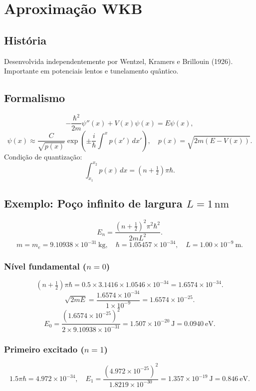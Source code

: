 \documentclass[12pt]{article}
\begin{document}
\section{Aproximação WKB}

\subsection{História}
Desenvolvida independentemente por Wentzel, Kramers e Brillouin (1926). Importante em potenciais lentos e tunelamento quântico.

\subsection{Formalismo}
\[
-\frac{\hbar^2}{2m}\psi''(x)+V(x)\psi(x)=E\psi(x),
\]
\[
\psi(x)\approx\frac{C}{\sqrt{p(x)}}\exp\left(\pm\frac{i}{\hbar}\int^x p(x')\,dx'\right),
\quad p(x)=\sqrt{2m(E-V(x))}.
\]
Condição de quantização:
\[
\int_{x_1}^{x_2}p(x)\,dx=\left(n+\tfrac12\right)\pi\hbar.
\]

\subsection{Exemplo: Poço infinito de largura $L=1\,\text{nm}$}
\[
E_n=\frac{(n+\tfrac12)^2\pi^2\hbar^2}{2mL^2}.
\]
\[
m=m_e=9.10938\times10^{-31}\ \text{kg},\quad
\hbar=1.05457\times10^{-34},\quad
L=1.00\times10^{-9}\ \text{m}.
\]

\subsubsection{Nível fundamental ($n=0$)}
\[
(n+\tfrac12)\pi\hbar=0.5\times3.1416\times1.0546\times10^{-34}=1.6574\times10^{-34}.
\]
\[
\sqrt{2mE}=\frac{1.6574\times10^{-34}}{1\times10^{-9}}=1.6574\times10^{-25}.
\]
\[
E_0=\frac{(1.6574\times10^{-25})^2}{2\times9.10938\times10^{-31}}=1.507\times10^{-20}\ \text{J}=0.0940\ \text{eV}.
\]

\subsubsection{Primeiro excitado ($n=1$)}
\[
1.5\pi\hbar=4.972\times10^{-34},\quad
E_1=\frac{(4.972\times10^{-25})^2}{1.8219\times10^{-30}}=1.357\times10^{-19}\ \text{J}=0.846\ \text{eV}.
\]
\end{document}
